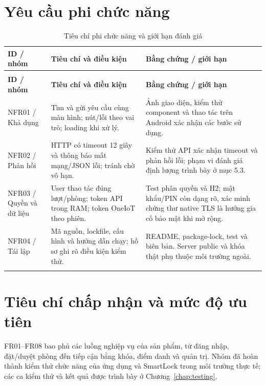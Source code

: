 \section{Yêu cầu phi chức năng}
{\tabletext\renewcommand{\arraystretch}{1.04}\begin{longtable}{>{\raggedright\arraybackslash}p{}>{\raggedright\arraybackslash}p{}>{\raggedright\arraybackslash}p{}}
\caption{Tiêu chí phi chức năng và giới hạn đánh giá}\label{tab:nfr}\\
\toprule \textbf{ID / nhóm} & \textbf{Tiêu chí và điều kiện} & \textbf{Bằng chứng / giới hạn}\\\midrule
\endfirsthead
\multicolumn{3}{l}{\small Tiêu chí phi chức năng và giới hạn đánh giá (tiếp)}\\
\toprule \textbf{ID / nhóm} & \textbf{Tiêu chí và điều kiện} & \textbf{Bằng chứng / giới hạn}\\\midrule
\endhead
\bottomrule\endlastfoot
NFR01 / Khả dụng & Tìm và gửi yêu cầu cùng màn hình; nút/lỗi theo vai trò; loading khi xử lý. & Ảnh giao diện, kiểm thử component và thao tác trên Android xác nhận các bước sử dụng.\\\addlinespace[1.5pt]
NFR02 / Phản hồi & HTTP có timeout 12 giây và thông báo mất mạng/JSON lỗi; tránh chờ vô hạn. & Kiểm thử API xác nhận timeout và phản hồi lỗi; phạm vi đánh giá định lượng trình bày ở mục 5.3.\\\addlinespace[1.5pt]
NFR03 / Quyền và dữ liệu & User thao tác đúng lượt/phòng; token API trong RAM; token OneIoT theo phiên. & Test phân quyền và H2; mật khẩu/PIN còn dạng rõ, xác minh chứng thư native TLS là hướng gia cố bảo mật khi mở rộng.\\\addlinespace[1.5pt]
NFR04 / Tái lập & Mã nguồn, lockfile, cấu hình và hướng dẫn chạy; hồ sơ ghi rõ điều kiện kiểm thử. & README, package-lock, test và biên bản. Server public và khóa thật phụ thuộc môi trường ngoài.\\\addlinespace[1.5pt]
\end{longtable}}

\section{Tiêu chí chấp nhận và mức độ ưu tiên}
FR01--FR08 bao phủ các luồng nghiệp vụ của sản phẩm, từ đăng nhập, đặt/duyệt phòng đến tiếp cận bằng khóa, điểm danh và quản trị. Nhóm đã hoàn thành kiểm thử chức năng của ứng dụng và SmartLock trong môi trường thực tế; các ca kiểm thử và kết quả được trình bày ở Chương~\ref{chap:testing}.

